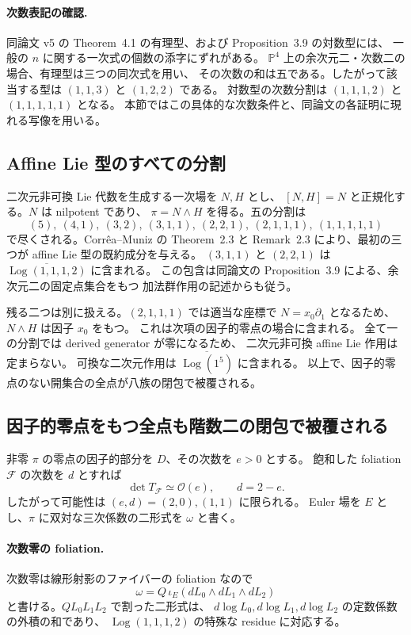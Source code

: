 \paragraph{次数表記の確認.}
同論文 v5 の Theorem~4.1 の有理型、および Proposition~3.9 の対数型には、
一般の $n$ に関する一次式の個数の添字にずれがある。
$\mathbb P^4$ 上の余次元二・次数二の場合、有理型は三つの同次式を用い、
その次数の和は五である。したがって該当する型は
$(1,1,3)$ と $(1,2,2)$ である。
対数型の次数分割は $(1,1,1,2)$ と $(1,1,1,1,1)$ となる。
本節ではこの具体的な次数条件と、同論文の各証明に現れる写像を用いる。

\subsection{Affine Lie 型のすべての分割}

二次元非可換 Lie 代数を生成する一次場を $N,H$ とし、
$[N,H]=N$ と正規化する。$N$ は nilpotent であり、
$\pi=N\wedge H$ を得る。五の分割は
\[
 (5),\ (4,1),\ (3,2),\ (3,1,1),\ (2,2,1),\
 (2,1,1,1),\ (1,1,1,1,1)
\]
で尽くされる。Corr\^ea--Muniz の Theorem~2.3 と Remark~2.3
\cite[Theorem~2.3, Remark~2.3]{CM} により、最初の三つが
affine Lie 型の既約成分を与える。
$(3,1,1)$ と $(2,2,1)$ は
$\overline{\operatorname{Log}(1,1,1,2)}$ に含まれる。
この包含は同論文の Proposition~3.9 による、余次元二の固定点集合をもつ
加法群作用の記述からも従う。

残る二つは別に扱える。$(2,1,1,1)$ では適当な座標で
$N=x_0\partial_1$ となるため、$N\wedge H$ は因子 $x_0$ をもつ。
これは次項の因子的零点の場合に含まれる。
全て一の分割では derived generator が零になるため、
二次元非可換 affine Lie 作用は定まらない。
可換な二次元作用は $\overline{\operatorname{Log}(1^5)}$ に含まれる。
以上で、因子的零点のない開集合の全点が八族の閉包で被覆される。

\subsection{因子的零点をもつ全点も階数二の閉包で被覆される}

非零 $\pi$ の零点の因子的部分を $D$、その次数を $e>0$ とする。
飽和した foliation $\mathcal F$ の次数を $d$ とすれば
\[
 \det T_{\mathcal F}\simeq\mathcal O(e),\qquad d=2-e.
\]
したがって可能性は $(e,d)=(2,0),(1,1)$ に限られる。
Euler 場を $E$ とし、$\pi$ に双対な三次係数の二形式を $\omega$ と書く。

\paragraph{次数零の foliation.}
次数零は線形射影のファイバーの foliation なので
\[
 \omega=Q\,\iota_E(dL_0\wedge dL_1\wedge dL_2)
\]
と書ける。$Q L_0L_1L_2$ で割った二形式は、
$d\log L_0,d\log L_1,d\log L_2$ の定数係数の外積の和であり、
$\operatorname{Log}(1,1,1,2)$ の特殊な residue に対応する。

